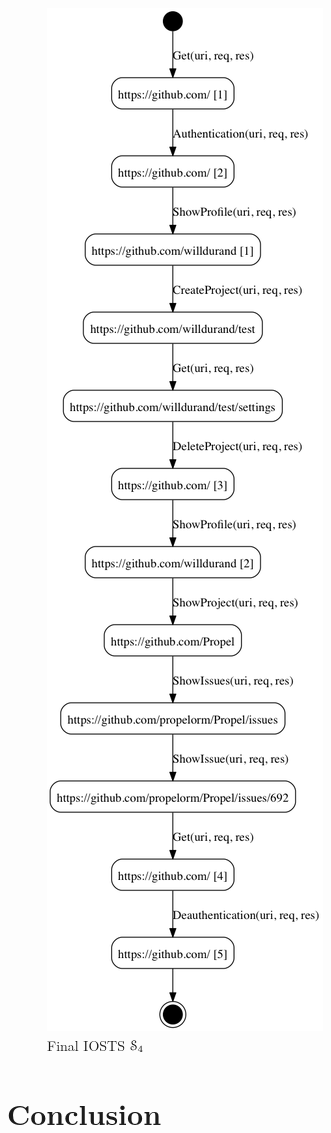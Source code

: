 \begin{figure}[ht]
    \includegraphics[width=.45\textwidth]{figures/gh-2-4-bis.png}

    \caption {Final IOSTS $\EuScript{S}_4$}
    \label{fig:git:iosts}
\end{figure}


\section{Conclusion}
\label{sec:modelinf:webapps:conclusion}


